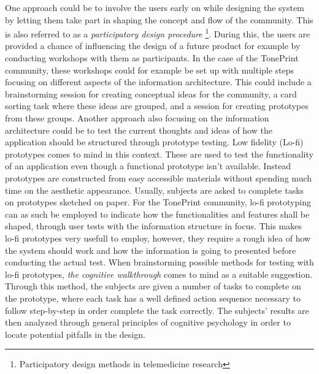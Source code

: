 \noindent
One approach could be to involve the users early on while designing the system by letting them take part in shaping the concept and flow of the community. This is also referred to as a \textit{participatory design procedure} \footnote{Participatory design methods in telemedicine research}. During this, the users are provided a chance of influencing the design of a future product for example by conducting workshops with them as participants. In the case of the TonePrint community, these workshops could for example be set up with multiple steps focusing on different aspects of the information architecture. This could include a brainstorming session for creating conceptual ideas for the community, a card sorting task where these ideas are grouped, and a session for creating prototypes from these groups. Another approach also focusing on the information architecture could be to test the current thoughts and ideas of how the application should be structured through prototype testing. Low fidelity (Lo-fi) prototypes comes to mind in this context. These are used to test the functionality of an application even though a functional prototype isn't available. Instead prototypes are constructed from easy accessible materials without spending much time on the aesthetic appearance. Usually, subjects are asked to complete tasks on prototypes sketched on paper. For the TonePrint community, lo-fi prototyping can as such be employed to indicate how the functionalities and features shall be shaped, through user tests with the information structure in focus. This makes lo-fi prototypes very usefull to employ, however, they require a rough idea of how the system should work and how the information is going to presented before conducting the actual test. When brainstorming possible methods for testing with lo-fi prototypes, \textit{the cognitive walkthrough} comes to mind as a suitable suggestion. Through this method, the subjects are given a number of tasks to complete on the prototype, where each task has a well defined action sequence necessary to follow step-by-step in order complete the task correctly. The subjects' results are then analyzed through general principles of cognitive psychology in order to locate potential pitfalls in the design.\\

